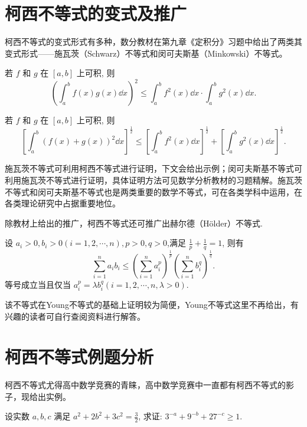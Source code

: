 \section{柯西不等式的变式及推广}

柯西不等式的变式形式有多种，数分教材在第九章《定积分》习题中给出了两类其变式形式——施瓦茨（Schwarz）不等式和闵可夫斯基（Minkowski）不等式。

\begin{theorem}\label{thm:shwarzinequality}
  若 $f$ 和 $g$ 在 $[a, b]$ 上可积, 则 \[\left(\int_{a}^{b} f(x) g(x) \dd{x}\right)^{2} \leq \int_{a}^{b} f^{2}(x) \dd{x} \cdot \int_{a}^{b} g^{2}(x) \dd{x}.\]
\end{theorem}


\begin{theorem}
  若 $f$ 和 $g$ 在 $[a, b]$ 上可积, 则 \[\left[\int_{a}^{b}(f(x)+g(x))^{2} \dd{x}\right]^{\frac{1}{2}} \leq\left[\int_{a}^{b} f^{2}(x) \dd{x}\right]^{\frac{1}{2}}+\left[\int_{a}^{b} g^{2}(x) \dd{x}\right]^{\frac{1}{2}}.\]
\end{theorem}


施瓦茨不等式可利用柯西不等式进行证明，下文会给出示例；闵可夫斯基不等式可利用施瓦茨不等式进行证明，具体证明方法可见数学分析教材的习题精解。施瓦茨不等式和闵可夫斯基不等式也是两类重要的数学不等式，可在各类学科中运用，在各类理论研究中占据重要地位。

除教材上给出的推广，柯西不等式还可推广出赫尔德（Hölder）不等式.


\begin{theorem}
  设 $a_{i}>0, b_{i}>0(i=1,2, \cdots, n), p>0, q>0$,满足 $\frac{1}{p}+\frac{1}{q}=1$, 则有 \[\sum_{i=1}^{n} a_{i} b_{i} \leq\left(\sum_{i=1}^{n} a_{i}^{p}\right)^{\frac{1}{p}}\left(\sum_{i=1}^{n} b_{i}^{q}\right)^{\frac{1}{q}}.\] 等号成立当且仅当 $a_{i}^{p}=\lambda b_{i}^{q}(i=1,2, \cdots, n, \lambda>0)$.
\end{theorem}

该不等式在Young不等式的基础上证明较为简便，Young不等式这里不再给出，有兴趣的读者可自行查阅资料进行解答。


\section{柯西不等式例题分析}

柯西不等式尤得高中数学竞赛的青睐，高中数学竞赛中一直都有柯西不等式的影子，现给出实例。

\begin{example}
  \parencite{李梦2019数学竞赛中柯西不等式的教学研究} 设实数 $a, b, c$ 满足 $a^{2}+2 b^{2}+3 c^{2}=\frac{3}{2}$, 求证: $3^{-a}+9^{-b}+27^{-c} \geq 1$. 
\end{example}


